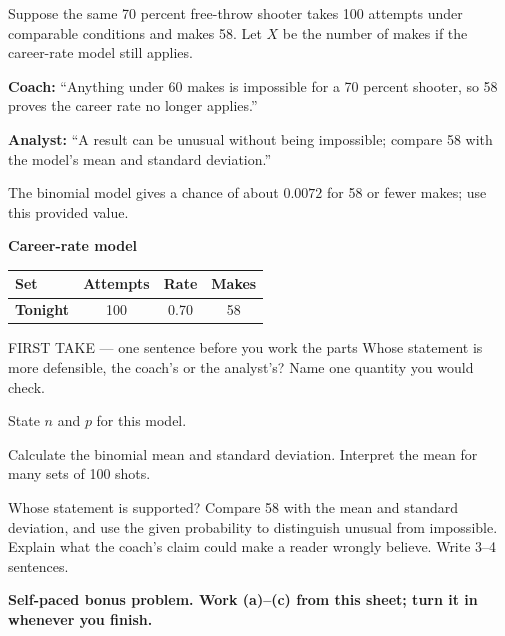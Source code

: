 \documentclass[14pt]{extarticle}
\begin{document}
\pagestyle{empty}


\noindent\begin{minipage}[t]{0.57\linewidth}
\vspace{0pt}
Suppose the same 70 percent free-throw shooter takes 100 attempts under comparable conditions and makes 58. Let $X$ be the number of makes if the career-rate model still applies.\par\smallskip \textbf{Coach:} ``Anything under 60 makes is impossible for a 70 percent shooter, so 58 proves the career rate no longer applies.''\par \textbf{Analyst:} ``A result can be unusual without being impossible; compare 58 with the model's mean and standard deviation.''\par The binomial model gives a chance of about $0.0072$ for 58 or fewer makes; use this provided value.\par
\end{minipage}\hfill
\begin{minipage}[t]{0.40\linewidth}
\vspace{0pt}
\begin{center}
\textbf{Career-rate model}\par\smallskip
\begin{tabular}{|l|c|c|c|}
\hline
\textbf{Set} & \textbf{Attempts} & \textbf{Rate} & \textbf{Makes} \\ \hline
\textbf{Tonight} & 100 & 0.70 & 58 \\ \hline
\end{tabular}
\end{center}
\end{minipage}

\begin{firsttakebox}{FIRST TAKE --- one sentence before you work the parts}
Whose statement is more defensible, the coach's or the analyst's? Name one quantity you would check.
\end{firsttakebox}

\begin{description}[leftmargin=1.15in, labelwidth=1in, itemsep=2pt, topsep=2pt]
  \item[\dokbadge{1}~(a)] State $n$ and $p$ for this model.
  \item[\dokbadge{2}~(b)] Calculate the binomial mean and standard deviation. Interpret the mean for many sets of 100 shots.
  \item[\dokbadge{3}~(c)] Whose statement is supported? Compare 58 with the mean and standard deviation, and use the given probability to distinguish unusual from impossible. Explain what the coach's claim could make a reader wrongly believe. Write 3--4 sentences.
\end{description}

\vfill
\textbf{Self-paced bonus problem. Work (a)--(c) from this sheet; turn it in whenever you finish.}
\end{document}
